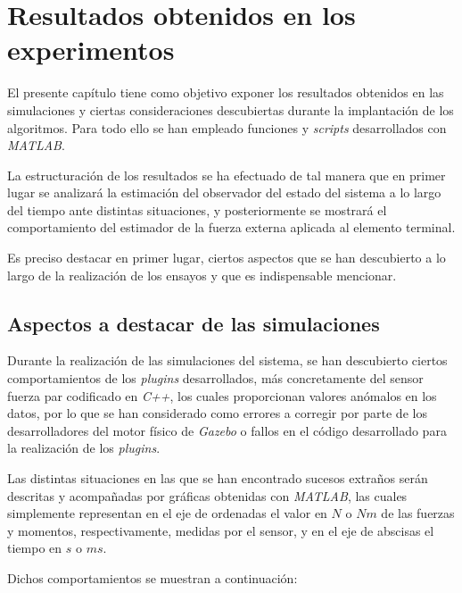 \chapter{Resultados obtenidos en los experimentos}

El presente capítulo tiene como objetivo exponer los resultados obtenidos en las simulaciones y ciertas consideraciones descubiertas durante la implantación de los algoritmos. Para todo ello se han empleado funciones y \emph{scripts} desarrollados con \emph{MATLAB}.\par

La estructuración de los resultados se ha efectuado de tal manera que en primer lugar se analizará la estimación del observador del estado del sistema a lo largo del tiempo ante distintas situaciones, y posteriormente se mostrará el comportamiento del estimador de la fuerza externa aplicada al elemento terminal. \par 

Es preciso destacar en primer lugar, ciertos aspectos que se han descubierto a lo largo de la realización de los ensayos y que es indispensable mencionar. \par 

\newpage
\section{Aspectos a destacar de las simulaciones}
\label{sec:dificultades}

Durante la realización de las simulaciones del sistema, se han descubierto ciertos comportamientos de los \emph{plugins} desarrollados, más concretamente del sensor fuerza par codificado en \emph{C++}, los cuales proporcionan valores anómalos en los datos, por lo que se han considerado como errores a corregir por parte de los desarrolladores del motor físico de \emph{Gazebo} o fallos en el código desarrollado para la realización de los \emph{plugins}. \par 

Las distintas situaciones en las que se han encontrado sucesos extraños serán descritas y acompañadas por gráficas obtenidas con \emph{MATLAB}, las cuales simplemente representan en el eje de ordenadas el valor en $N$ o $Nm$ de las fuerzas y momentos, respectivamente, medidas por el sensor, y en el eje de abscisas el tiempo en $s$ o $ms$. \par 

\noindent
Dichos comportamientos se muestran a continuación:

